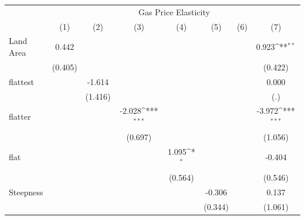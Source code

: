 {
\def\sym#1{\ifmmode^{#1}\else\(^{#1}\)\fi}
\begin{tabular}{l*{7}{c}}
\hline\hline
            &\multicolumn{7}{c}{Gas Price Elasticity}                                                                                                                 \\
            &\multicolumn{1}{c}{(1)}         &\multicolumn{1}{c}{(2)}         &\multicolumn{1}{c}{(3)}         &\multicolumn{1}{c}{(4)}         &\multicolumn{1}{c}{(5)}         &\multicolumn{1}{c}{(6)}         &\multicolumn{1}{c}{(7)}         \\
\hline
Land Area   &       0.442         &                     &                     &                     &                     &                     &       0.923\sym{**} \\
            &     (0.405)         &                     &                     &                     &                     &                     &     (0.422)         \\
[1em]
flattest    &                     &      -1.614         &                     &                     &                     &                     &       0.000         \\
            &                     &     (1.416)         &                     &                     &                     &                     &         (.)         \\
[1em]
flatter     &                     &                     &      -2.028\sym{***}&                     &                     &                     &      -3.972\sym{***}\\
            &                     &                     &     (0.697)         &                     &                     &                     &     (1.056)         \\
[1em]
flat        &                     &                     &                     &       1.095\sym{*}  &                     &                     &      -0.404         \\
            &                     &                     &                     &     (0.564)         &                     &                     &     (0.546)         \\
[1em]
Steepness   &                     &                     &                     &                     &      -0.306         &                     &       0.137         \\
            &                     &                     &                     &                     &     (0.344)         &                     &     (1.061)         \\

\end{tabular}}
